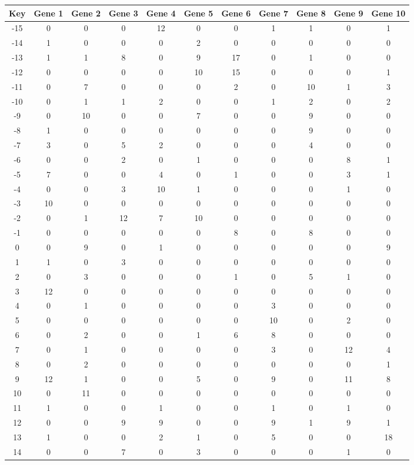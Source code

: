 \begin{tabular}{|c|c|c|c|c|c|c|c|c|c|c|}
\hline
Key & Gene 1 & Gene 2 & Gene 3 & Gene 4 & Gene 5 & Gene 6 & Gene 7 & Gene 8 & Gene 9 & Gene 10 \\
\hline
-15 & 0 & 0 & 0 & 12 & 0 & 0 & 1 & 1 & 0 & 1 \\
-14 & 1 & 0 & 0 & 0 & 2 & 0 & 0 & 0 & 0 & 0 \\
-13 & 1 & 1 & 8 & 0 & 9 & 17 & 0 & 1 & 0 & 0 \\
-12 & 0 & 0 & 0 & 0 & 10 & 15 & 0 & 0 & 0 & 1 \\
-11 & 0 & 7 & 0 & 0 & 0 & 2 & 0 & 10 & 1 & 3 \\
-10 & 0 & 1 & 1 & 2 & 0 & 0 & 1 & 2 & 0 & 2 \\
-9 & 0 & 10 & 0 & 0 & 7 & 0 & 0 & 9 & 0 & 0 \\
-8 & 1 & 0 & 0 & 0 & 0 & 0 & 0 & 9 & 0 & 0 \\
-7 & 3 & 0 & 5 & 2 & 0 & 0 & 0 & 4 & 0 & 0 \\
-6 & 0 & 0 & 2 & 0 & 1 & 0 & 0 & 0 & 8 & 1 \\
-5 & 7 & 0 & 0 & 4 & 0 & 1 & 0 & 0 & 3 & 1 \\
-4 & 0 & 0 & 3 & 10 & 1 & 0 & 0 & 0 & 1 & 0 \\
-3 & 10 & 0 & 0 & 0 & 0 & 0 & 0 & 0 & 0 & 0 \\
-2 & 0 & 1 & 12 & 7 & 10 & 0 & 0 & 0 & 0 & 0 \\
-1 & 0 & 0 & 0 & 0 & 0 & 8 & 0 & 8 & 0 & 0 \\
0 & 0 & 9 & 0 & 1 & 0 & 0 & 0 & 0 & 0 & 9 \\
1 & 1 & 0 & 3 & 0 & 0 & 0 & 0 & 0 & 0 & 0 \\
2 & 0 & 3 & 0 & 0 & 0 & 1 & 0 & 5 & 1 & 0 \\
3 & 12 & 0 & 0 & 0 & 0 & 0 & 0 & 0 & 0 & 0 \\
4 & 0 & 1 & 0 & 0 & 0 & 0 & 3 & 0 & 0 & 0 \\
5 & 0 & 0 & 0 & 0 & 0 & 0 & 10 & 0 & 2 & 0 \\
6 & 0 & 2 & 0 & 0 & 1 & 6 & 8 & 0 & 0 & 0 \\
7 & 0 & 1 & 0 & 0 & 0 & 0 & 3 & 0 & 12 & 4 \\
8 & 0 & 2 & 0 & 0 & 0 & 0 & 0 & 0 & 0 & 1 \\
9 & 12 & 1 & 0 & 0 & 5 & 0 & 9 & 0 & 11 & 8 \\
10 & 0 & 11 & 0 & 0 & 0 & 0 & 0 & 0 & 0 & 0 \\
11 & 1 & 0 & 0 & 1 & 0 & 0 & 1 & 0 & 1 & 0 \\
12 & 0 & 0 & 9 & 9 & 0 & 0 & 9 & 1 & 9 & 1 \\
13 & 1 & 0 & 0 & 2 & 1 & 0 & 5 & 0 & 0 & 18 \\
14 & 0 & 0 & 7 & 0 & 3 & 0 & 0 & 0 & 1 & 0 \\
\hline
\end{tabular}